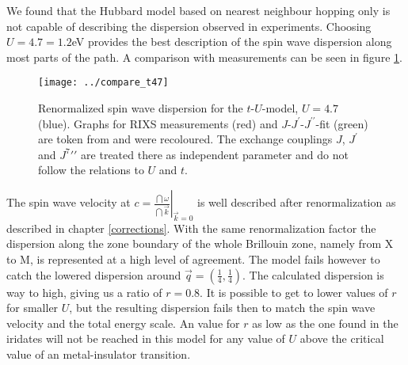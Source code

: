 We found that the Hubbard model based on nearest neighbour hopping only is not capable of describing the dispersion observed in experiments.
Choosing $U=4.7 = 1.2$eV provides the best description of the spin wave dispersion along most parts of the path.
A comparison with measurements can be seen in figure \ref{tU47}. 
%
\begin{figure}
 \begin{center}
  \texttt{[image: ../compare\_t47]}
  \caption{Renormalized spin wave dispersion for the $t$-$U$-model, $U=4.7$ (blue). Graphs for RIXS measurements (red) and $J$-$J^{\prime}$-$J^{\prime \prime}$-fit (green) are
	    token from \cite{PhysRevLett.106.136402} and were recoloured. The exchange couplings $J$, $J^{\prime}$ and $J^7{\prime \prime}$ are treated there as independent 
	    parameter and do not follow the relations to $U$ and $t$.}
 \label{tU47}
 \end{center}
\end{figure}
%
The spin wave velocity at $c=\left. \frac{\dint \omega}{\dint \vec k} \right|_{\vec k = 0}$ is well described after renormalization as described in chapter \ref{corrections}.
With the same renormalization factor the dispersion along
the zone boundary of the whole Brillouin zone, namely from X to M, is represented at a high level of agreement.
The model fails however to catch the lowered dispersion around $\vec q = (\frac 14, \frac14)$.
The calculated dispersion is way to high, giving us a ratio of $r=0.8$. 
It is possible to get to lower values of $r$ for smaller $U$, but the resulting dispersion fails then to match the spin wave velocity and 
the total energy scale. An value for $r$ as low as the one found in the iridates will not be reached in this model
for any value of $U$ above the critical value of an metal-insulator transition.



